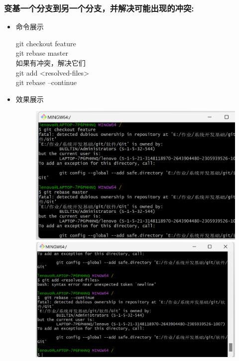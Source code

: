 \documentclass[UTF8]{ctexart}
\begin{document}
\subsubsection{变基一个分支到另一个分支，并解决可能出现的冲突:}
\begin{itemize}
  \item 命令展示
 
     git checkout feature \\
     git rebase master\\
      如果有冲突，解决它们\\
    git add <resolved-files>\\
    git rebase --continue
\item 效果展示
   \begin{figure}[H]
\includegraphics[width=1\textwidth]{30}
\includegraphics[width=1\textwidth]{31}
\end{figure}
\end{itemize}
\end{document}
